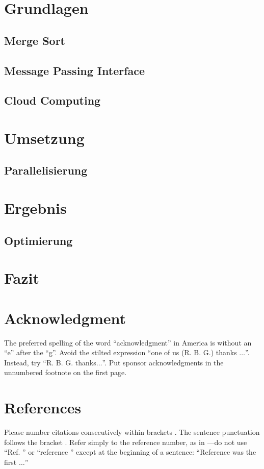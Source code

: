 \documentclass[conference]{IEEEtran}
\begin{document}
\section{Grundlagen}

\subsection{Merge Sort}
 \subsection{Message Passing Interface}
 \subsection{Cloud Computing}
\section{Umsetzung}

\subsection{Parallelisierung}
\section{Ergebnis}
\subsection{Optimierung}

\section{Fazit}

\section*{Acknowledgment}

The preferred spelling of the word ``acknowledgment'' in America is without 
an ``e'' after the ``g''. Avoid the stilted expression ``one of us (R. B. 
G.) thanks $\ldots$''. Instead, try ``R. B. G. thanks$\ldots$''. Put sponsor 
acknowledgments in the unnumbered footnote on the first page.

\section*{References}

Please number citations consecutively within brackets \cite{b1}. The 
sentence punctuation follows the bracket \cite{b2}. Refer simply to the reference 
number, as in \cite{b3}---do not use ``Ref. \cite{b3}'' or ``reference \cite{b3}'' except at 
the beginning of a sentence: ``Reference \cite{b3} was the first $\ldots$''
\end{document}
